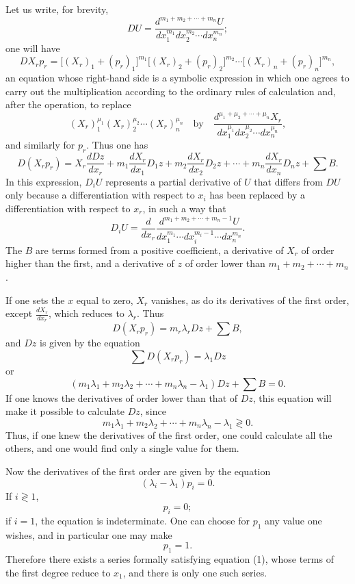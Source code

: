\documentclass[11pt]{article}
\begin{document}
Let us write, for brevity,
\[
DU=\frac{d^{m_1+m_2+\cdots+m_n}U}{dx_1^{m_1}dx_2^{m_2}\cdots dx_n^{m_n}};
\]
one will have
\[
DX_rp_r=\bigl[(X_r)_1+(p_r)_1\bigr]^{m_1}\bigl[(X_r)_2+(p_r)_2\bigr]^{m_2}\cdots\bigl[(X_r)_n+(p_r)_n\bigr]^{m_n},
\]
an equation whose right-hand side is a symbolic expression in which one agrees to carry out the multiplication according to the ordinary rules of calculation and, after the operation, to replace
\[
(X_r)_1^{\mu_1}(X_r)_2^{\mu_2}\cdots(X_r)_n^{\mu_n}
\quad\text{by}\quad
\frac{d^{\mu_1+\mu_2+\cdots+\mu_n}X_r}{dx_1^{\mu_1}dx_2^{\mu_2}\cdots dx_n^{\mu_n}},
\]
and similarly for $p_r$.
Thus one has
\[
D(X_rp_r)=X_r\frac{dDz}{dx_r}
+m_1\frac{dX_r}{dx_1}D_1z
+m_2\frac{dX_r}{dx_2}D_2z
+\cdots+
 m_n\frac{dX_r}{dx_n}D_nz+\sum B.
\]
In this expression, $D_iU$ represents a partial derivative of $U$ that differs from $DU$ only because a differentiation with respect to $x_i$ has been replaced by a differentiation with respect to $x_r$, in such a way that
\[
D_iU=\frac{d}{dx_r}\frac{d^{m_1+m_2+\cdots+m_n-1}U}{dx_1^{m_1}\cdots dx_i^{m_i-1}\cdots dx_n^{m_n}}.
\]
The $B$ are terms formed from a positive coefficient, a derivative of $X_r$ of order higher than the first, and a derivative of $z$ of order lower than $m_1+m_2+\cdots+m_n$.

If one sets the $x$ equal to zero, $X_r$ vanishes, as do its derivatives of the first order, except $\frac{dX_r}{dx_r}$, which reduces to $\lambda_r$. Thus
\[
D(X_rp_r)=m_r\lambda_rDz+\sum B,
\]
and $Dz$ is given by the equation
\[
\sum D(X_rp_r)=\lambda_1Dz
\]
or
\begin{equation*}\tag{4}
(m_1\lambda_1+m_2\lambda_2+\cdots+m_n\lambda_n-\lambda_1)Dz+\sum B=0.
\end{equation*}
If one knows the derivatives of order lower than that of $Dz$, this equation will make it possible to calculate $Dz$, since
\[
m_1\lambda_1+m_2\lambda_2+\cdots+m_n\lambda_n-\lambda_1 \gtrless 0.
\]
Thus, if one knew the derivatives of the first order, one could calculate all the others, and one would find only a single value for them.

Now the derivatives of the first order are given by the equation
\[
(\lambda_i-\lambda_1)p_i=0.
\]
If $i\gtrless1$,
\[
p_i=0;
\]
if $i=1$, the equation is indeterminate. One can choose for $p_1$ any value one wishes, and in particular one may make
\[
p_1=1.
\]
Therefore there exists a series formally satisfying equation (1), whose terms of the first degree reduce to $x_1$, and there is only one such series.
\end{document}
